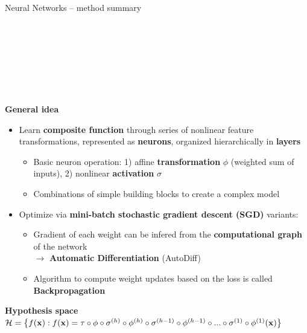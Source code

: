 \documentclass[11pt,compress,t,notes=noshow, xcolor=table]{beamer}
\newcommand{\highlight}[1]{\textcolor{hlcol}{\textbf{#1}}}
\newcommand{\maketag}[2][100]{
  \colorbox{hlcol!#1}{\textcolor{white}{\MakeUppercase{\scriptsize #2}} 
  \vphantom{}}
}
\begin{document}
\begin{vbframe}{Neural Networks -- method summary}

  \maketag{regression} \maketag{classification}
  \maketag[50]{(non)parametric}
  \maketag{BLACK-BOX} %
  
  \medskip
  
  \highlight{General idea}
  \begin{itemize}
    \item Learn \textbf{composite function} through series of nonlinear feature 
    transformations, represented as \textbf{neurons}, organized hierarchically 
    in \textbf{layers}
    \begin{itemize}
      \item Basic neuron operation: 1) affine \textbf{transformation} $\phi$ (weighted sum of inputs), 
      2) nonlinear \textbf{activation} $\sigma$
      \item Combinations of simple building 
      blocks to create a complex model
    \end{itemize}
    \item Optimize via \textbf{mini-batch stochastic gradient descent (SGD)} variants:
    \begin{itemize}
      \item Gradient of each weight can be infered from the \textbf{computational graph} of the network\\
      $\rightarrow$ \textbf{Automatic Differentiation} (AutoDiff)
      \item Algorithm to compute weight updates based on the loss is called \textbf{Backpropagation}
    \end{itemize}
  \end{itemize}
  
  \medskip
   
  \highlight{Hypothesis space} ~~
  $\mathcal{H} = \left\{ f(\mathbf{x}): f(\mathbf{x}) = \tau \circ \phi \circ \sigma^{(h)} \circ
  \phi^{(h)} \circ \sigma^{(h - 1)} \circ \phi^{(h - 1)} \circ ... \circ 
  \sigma^{(1)} \circ \phi^{(1)} (\mathbf{x}) \right\}$
  

\end{vbframe}
\end{document}
